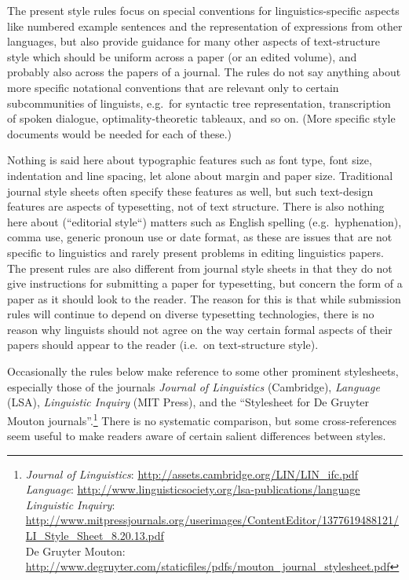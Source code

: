 \documentclass[a4paper]{article}
\begin{document}
The present style rules focus on
special conventions for linguistics-specific aspects like numbered
example sentences and the representation of expressions from other
languages, but also provide guidance for many other aspects of
text-structure style which should be uniform across a paper (or an
edited volume), and probably also across the papers of a journal. The
rules do not say anything about more specific notational conventions
that are relevant only to certain subcommunities of linguists, e.g.~for
syntactic tree representation, transcription of spoken dialogue,
optimality-theoretic tableaux, and so on. (More specific style documents
would be needed for each of these.)

Nothing is said here about typographic features such as font type, font
size, indentation and line spacing, let alone about margin and paper
size. Traditional journal style sheets often specify these features as
well, but such text-design features are aspects of typesetting, not of
text structure. There is also nothing here about (``editorial style``)
matters such as English spelling (e.g.~hyphenation), comma use, generic
pronoun use or date format, as these are issues that are not specific to
linguistics and rarely present problems in editing linguistics papers.
The present rules are also different from journal style sheets in that
they do not give instructions for submitting a paper for typesetting,
but concern the form of a paper as it should look to the reader. The
reason for this is that while submission rules will continue to depend
on diverse typesetting technologies, there is no reason why linguists
should not agree on the way certain formal aspects of their papers
should appear to the reader (i.e.~on text-structure style). 

Occasionally
the rules below make reference to some other prominent stylesheets,
especially those of the journals 
\textit{Journal of Linguistics} (Cambridge),
\textit{Language} (LSA), 
\textit{Linguistic Inquiry} (MIT Press), and the
``Stylesheet for De Gruyter Mouton journals''.\footnote{%
  \textit{Journal of Linguistics}:
    \url{http://assets.cambridge.org/LIN/LIN_ifc.pdf} \\
  \textit{Language}:
    \url{http://www.linguisticsociety.org/lsa-publications/language}\\
  \textit{Linguistic Inquiry}:
    \url{http://www.mitpressjournals.org/userimages/ContentEditor/1377619488121/LI_Style_Sheet_8.20.13.pdf}\\
  {De Gruyter Mouton}:
    \url{http://www.degruyter.com/staticfiles/pdfs/mouton_journal_stylesheet.pdf}
} 
There is no systematic comparison, but some cross-references seem
useful to make readers aware of certain salient differences between
styles. 
\end{document}
